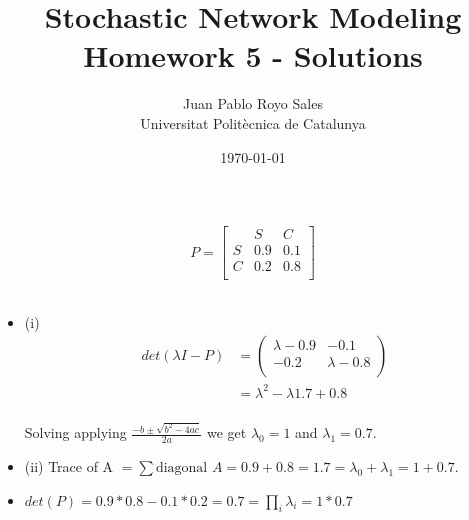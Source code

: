\documentclass[12pt, a4paper]{article}
\title{%
  Stochastic Network Modeling \\
  Homework 5 - Solutions
}
\author{%
  Juan Pablo Royo Sales\\
  \small{Universitat Politècnica de Catalunya}
}
\date\today
\begin{document}
\maketitle

\section{}
\subsection{}
\subsection{}

\begin{align*}
  P = \begin{bmatrix}
       & S & C \\
   S   & 0.9 & 0.1\\
   C   & 0.2 & 0.8\\
  \end{bmatrix}
\end{align*}

\subsection{}
\begin{itemize}
  \item (i)
\begin{subequations}
  \begin{align}
    det(\lambda I - P) &= \begin{pmatrix}
    \lambda - 0.9 & -0.1\\
    -0.2 & \lambda - 0.8\\
  \end{pmatrix}\\
  &= \lambda^2 - \lambda 1.7 + 0.8\\
  \end{align}
\end{subequations}

Solving applying $ \frac{-b \pm \sqrt{b^2 - 4ac}}{2a}$ we get $\lambda_0 = 1$ and $\lambda_1 = 0.7$.

  \item (ii) Trace of A $ = \sum \text{diagonal } A = 0.9+0.8 = 1.7 = \lambda_0 + \lambda_1 = 1 + 0.7$.
  \item $det(P) = 0.9 * 0.8 - 0.1 * 0.2 = 0.7 = \prod_i \lambda_i = 1 * 0.7$

\end{itemize}
\end{document}
